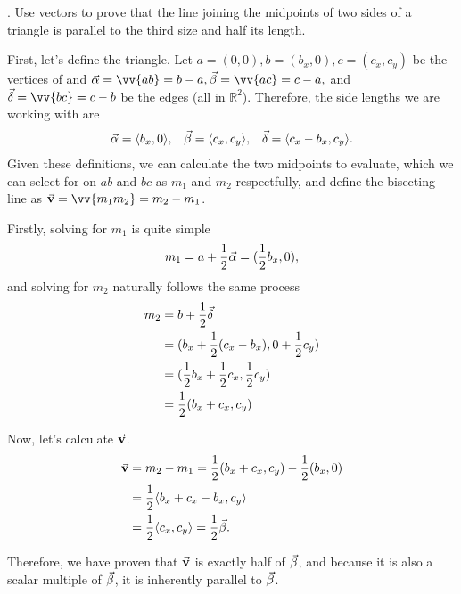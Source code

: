 \documentclass{report}
\newcounter{problemctr}
\newcounter{subproblemctr}[problemctr]
\newcommand{\problem}[1]{%
  \stepcounter{problemctr}%
  \setcounter{subproblemctr}{0}%
  \noindent\arabic{problemctr}. #1\par
}
\newenvironment{answer}
{\begin{minipage}{\linewidth}}
{\end{minipage}}
\begin{document}
\problem{Use vectors to prove that the line joining the midpoints of two sides of a triangle is parallel to the third size and half its length.}
\begin{answer}
First, let's define the triangle. Let $a=(0,0), b=(b_x, 0), c=(c_x, c_y)$ be the vertices of and $\va{\alpha}=\vv{ab}=b-a, \va{\beta}=\vv{ac}=c-a,$ and $\va{\delta}=\vv{bc}=c-b$ be the edges (all in $\mathbb{R}^2$). Therefore, the side lengths we are working with are
\begin{align*}
\va{\alpha} = \langle b_x, 0 \rangle, & & \va{\beta} = \langle c_x, c_y \rangle, & & \va{\delta} = \langle c_x - b_x, c_y \rangle.
\end{align*}
Given these definitions, we can calculate the two midpoints to evaluate, which we can select for on $\bar{ab}$ and $\bar{bc}$ as $m_1$ and $m_2$ respectfully, and define the bisecting line as $\va{v} = \vv{m_1 m_2} = m_2 - m_1$.

Firstly, solving for $m_1$ is quite simple
$$m_1 = a + \frac{1}{2} \va{\alpha} = (\frac{1}{2} b_x, 0),$$
and solving for $m_2$ naturally follows the same process
\begin{align*}
m_2 &= b + \frac{1}{2} \va{\delta} \\
&= (b_x + \frac{1}{2} (c_x - b_x), 0 + \frac{1}{2} c_y) \\
&= (\frac{1}{2} b_x + \frac{1}{2} c_x, \frac{1}{2} c_y) \\
&= \frac{1}{2} (b_x + c_x, c_y) 
\end{align*}

Now, let's calculate $\va{v}$.
\begin{align*}
\va{v} &= m_2 - m_1 = \frac{1}{2} (b_x + c_x, c_y) - \frac{1}{2} (b_x, 0) \\
&= \frac{1}{2} \langle b_x + c_x - b_x, c_y \rangle \\
&= \frac{1}{2} \langle c_x, c_y \rangle = \frac{1}{2} \va{\beta}.
\end{align*}

Therefore, we have proven that $\va{v}$ is exactly half of $\va{\beta}$, and because it is also a scalar multiple of $\va{\beta}$, it is inherently parallel to $\va{\beta}$.
\end{answer}
\end{document}
